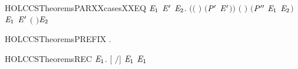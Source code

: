 \begin{SaveVerbatim}{HOLCCSTheoremsPARXXcasesXXEQ}
     \HOLSymConst{\HOLTokenExists{}}  \ensuremath{\HOLBoundVar{E}\sb{\mathrm{1}}} \ensuremath{\HOLBoundVar{E}\sp{\prime{}}} \ensuremath{\HOLBoundVar{E}\sb{\mathrm{2}}}.
       \ensuremath{(}\ensuremath{(} \HOLSymConst{\ensuremath{=}} \ensuremath{)} \HOLSymConst{\HOLTokenConj{}} \ensuremath{(}\ensuremath{\HOLBoundVar{P}\sp{\prime{}}} \HOLSymConst{\ensuremath{=}} \ensuremath{\HOLBoundVar{E}\sp{\prime{}}}\ensuremath{)}\ensuremath{)} \HOLSymConst{\HOLTokenConj{}} \ensuremath{(} \HOLSymConst{\ensuremath{=}} \HOLConst{\ensuremath{\tau}}\ensuremath{)} \HOLSymConst{\HOLTokenConj{}} \ensuremath{(}\ensuremath{\HOLBoundVar{P}\sp{\prime{}\prime{}}} \HOLSymConst{\ensuremath{=}} \ensuremath{\HOLBoundVar{E}\sb{\mathrm{1}}} \HOLSymConst{\ensuremath{\mid}} \ensuremath{\HOLBoundVar{E}\sb{\mathrm{2}}}\ensuremath{)} \HOLSymConst{\HOLTokenConj{}}
        \HOLTokenTransBegin{} \HOLTokenTransEnd \ensuremath{\HOLBoundVar{E}\sb{\mathrm{1}}} \HOLSymConst{\HOLTokenConj{}} \ensuremath{\HOLBoundVar{E}\sp{\prime{}}} \HOLTokenTransBegin{} \ensuremath{(} \ensuremath{)}\HOLTokenTransEnd \ensuremath{\HOLBoundVar{E}\sb{\mathrm{2}}}
\end{SaveVerbatim}
\newcommand{\HOLCCSTheoremsPARXXcasesXXEQ}{\UseVerbatim{HOLCCSTheoremsPARXXcasesXXEQ}}
\begin{SaveVerbatim}{HOLCCSTheoremsPREFIX}
\HOLTokenTurnstile{} \HOLSymConst{\HOLTokenForall{}} . \HOLSymConst{\ensuremath{\ldotp}} \HOLTokenTransBegin{}\HOLTokenTransEnd {}
\end{SaveVerbatim}
\newcommand{\HOLCCSTheoremsPREFIX}{\UseVerbatim{HOLCCSTheoremsPREFIX}}
\begin{SaveVerbatim}{HOLCCSTheoremsREC}
\HOLTokenTurnstile{} \HOLSymConst{\HOLTokenForall{}}   \ensuremath{\HOLBoundVar{E}\sb{\mathrm{1}}}. \ensuremath{[}  \ensuremath{/}\ensuremath{]}  \HOLTokenTransBegin{}\HOLTokenTransEnd \ensuremath{\HOLBoundVar{E}\sb{\mathrm{1}}} \HOLSymConst{\HOLTokenImp{}}    \HOLTokenTransBegin{}\HOLTokenTransEnd \ensuremath{\HOLBoundVar{E}\sb{\mathrm{1}}}
\end{SaveVerbatim}
\newcommand{\HOLCCSTheoremsREC}{\UseVerbatim{HOLCCSTheoremsREC}}
